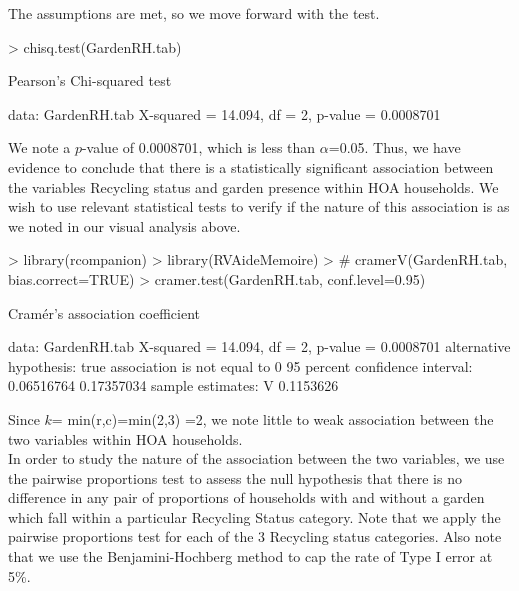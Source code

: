 \documentclass{article}
\begin{document}
The assumptions are met, so we move forward with the test.

\begin{Schunk}
\begin{Sinput}
> chisq.test(GardenRH.tab)
\end{Sinput}
\begin{Soutput}
	Pearson's Chi-squared test

data:  GardenRH.tab
X-squared = 14.094, df = 2, p-value = 0.0008701
\end{Soutput}
\end{Schunk}

We note a $p$-value of 0.0008701, which is less than $\alpha$=0.05. Thus, we have evidence to conclude that there is a statistically significant association between the variables Recycling status and garden presence within HOA households. We wish to use relevant statistical tests to verify if the nature of this association is as we noted in our visual analysis above.\\

\begin{Schunk}
\begin{Sinput}
> library(rcompanion)
> library(RVAideMemoire)
> # cramerV(GardenRH.tab, bias.correct=TRUE)
> cramer.test(GardenRH.tab, conf.level=0.95)
\end{Sinput}
\begin{Soutput}
	Cramér's association coefficient

data:  GardenRH.tab
X-squared = 14.094, df = 2, p-value = 0.0008701
alternative hypothesis: true association is not equal to 0
95 percent confidence interval:
 0.06516764 0.17357034
sample estimates:
        V 
0.1153626 
\end{Soutput}
\end{Schunk}

Since $k$= min(r,c)=min(2,3) =2, we note little to weak association between the two variables within HOA households.\\

In order to study the nature of the association between the two variables, we use the pairwise proportions test to assess the null hypothesis that there is no difference in any pair of proportions of households with and without a garden which fall within a particular Recycling Status category. Note that we apply the pairwise proportions test for each of the 3 Recycling status categories. Also note that we use the Benjamini-Hochberg method to cap the rate of Type I error at 5\%.
\end{document}
